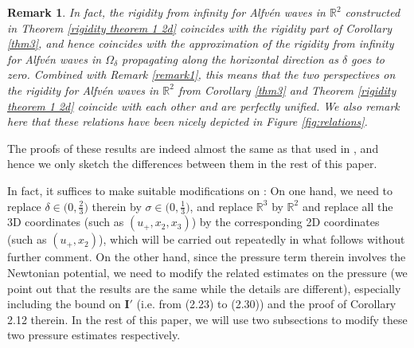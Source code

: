 \documentclass[10pt,reqno]{amsart}
\numberwithin{equation}{section}
\newtheorem{remark}[theorem]{Remark}
\begin{document}
\begin{appendix}
\begin{remark}
	In fact, the rigidity from infinity for Alfv\'en waves in $\mathbb{R}^2$  constructed in Theorem \ref{rigidity theorem 1 2d} coincides with the rigidity part of Corollary \ref{thm3}, and hence  coincides with the approximation of the rigidity from infinity for Alfv\'en waves in $\Omega_{\delta}$ propagating along the horizontal direction as $\delta$ goes to zero. Combined  with Remark \ref{remark1}, this means that   the two perspectives  on the rigidity for Alfv\'en waves in $\mathbb{R}^2$ from Corollary \ref{thm3} and Theorem \ref{rigidity theorem 1 2d} coincide with each other and are perfectly unified. We also remark here that these relations have been nicely depicted in Figure \ref{fig:relations}.
\end{remark}
	
	
	

The proofs of these results are indeed almost the same as that used in \cite{Li-Yu}, and hence we only  sketch the differences between them in the rest of this paper. 

In fact, it suffices to make suitable modifications on \cite{Li-Yu}: On one hand, we need to replace $\delta\in\big(0,\frac{2}{3}\big)$ therein by $\sigma\in\big(0,\frac{1}{3}\big)$, and replace $\mathbb{R}^3$ by $\mathbb{R}^2$ and replace all the 3D coordinates (such as $(u_+,x_2,x_3)$) by the corresponding 2D coordinates (such as $(u_+,x_2)$), which will be carried out repeatedly in what follows without further comment. On the other hand, since the pressure term therein  involves the Newtonian potential, we need to modify the related estimates on the pressure (we point out that the results are the same while the details are different), especially including the bound on $\mathbf{I'}$ (i.e. from (2.23) to (2.30)) and the proof of Corollary 2.12 therein. In the rest of this paper, we will use two subsections to modify these two pressure estimates respectively.




\end{appendix}
\end{document}
